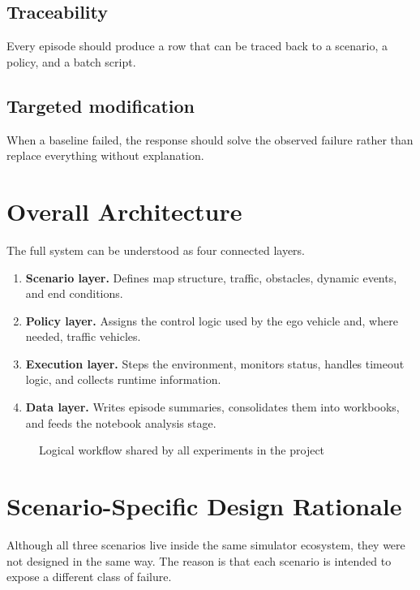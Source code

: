 \documentclass[12pt,a4paper]{report}
\begin{document}
\subsection*{Traceability}
Every episode should produce a row that can be traced back to a scenario, a policy, and a batch script.

\subsection*{Targeted modification}
When a baseline failed, the response should solve the observed failure rather than replace everything without explanation.

\section{Overall Architecture}
The full system can be understood as four connected layers.

\begin{enumerate}[label=\textbf{L\arabic*:}, leftmargin=2.2cm]
    \item \textbf{Scenario layer.} Defines map structure, traffic, obstacles, dynamic events, and end conditions.
    \item \textbf{Policy layer.} Assigns the control logic used by the ego vehicle and, where needed, traffic vehicles.
    \item \textbf{Execution layer.} Steps the environment, monitors status, handles timeout logic, and collects runtime information.
    \item \textbf{Data layer.} Writes episode summaries, consolidates them into workbooks, and feeds the notebook analysis stage.
\end{enumerate}

\begin{figure}[H]
    \centering
    \caption{Logical workflow shared by all experiments in the project}
    \label{fig:workflow}
\end{figure}

\section{Scenario-Specific Design Rationale}
Although all three scenarios live inside the same simulator ecosystem, they were not designed in the same way. The reason is that each scenario is intended to expose a different class of failure.
\end{document}
